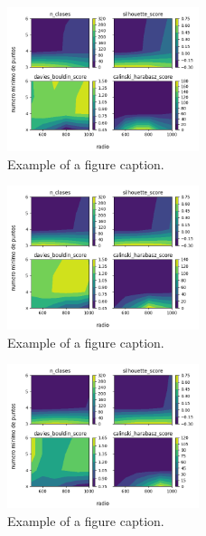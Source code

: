 \begin{figure}[htbp]
\centerline{\includegraphics[width=0.5\textwidth]{graficos_experimentos/dbscan/caracteristicos1_pca0.9.png}}
\caption{Example of a figure caption.}
\label{graficos_experimentos/dbscan/caracteristicos1_pca0.9.png}
\end{figure}
 
\begin{figure}[htbp]
\centerline{\includegraphics[width=0.5\textwidth]{graficos_experimentos/dbscan/caracteristicos1_pca0.95.png}}
\caption{Example of a figure caption.}
\label{graficos_experimentos/dbscan/caracteristicos1_pca0.95.png}
\end{figure}
 
\begin{figure}[htbp]
\centerline{\includegraphics[width=0.5\textwidth]{graficos_experimentos/dbscan/caracteristicos1_pca0.99.png}}
\caption{Example of a figure caption.}
\label{graficos_experimentos/dbscan/caracteristicos1_pca0.99.png}
\end{figure}
 

